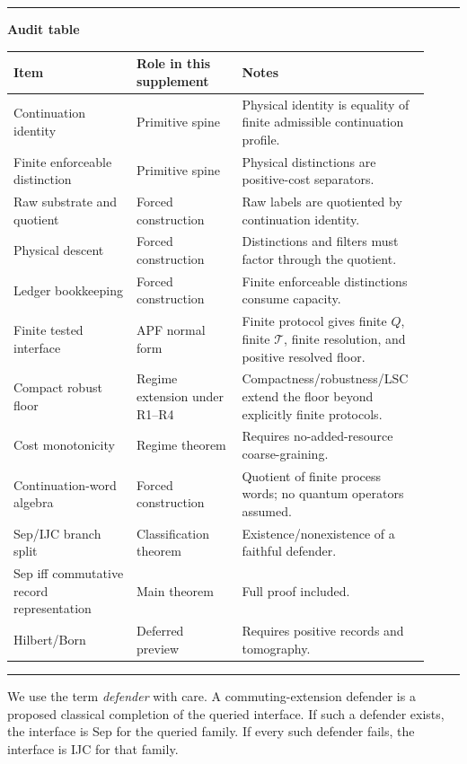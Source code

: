 \documentclass[11pt]{article}
\newenvironment{auditbox}{\par\medskip\hrule\vspace{0.4em}\textbf{Audit table}\par\vspace{0.3em}}{\vspace{0.5em}\hrule\par\medskip}
\begin{document}
\begin{auditbox}
\begin{center}
\scriptsize
\begin{tabular}{@{}p{0.28\linewidth}p{0.24\linewidth}p{0.40\linewidth}@{}}
\toprule
Item & Role in this supplement & Notes \\
\midrule
Continuation identity & Primitive spine & Physical identity is equality of finite admissible continuation profile. \\
Finite enforceable distinction & Primitive spine & Physical distinctions are positive-cost separators. \\
Raw substrate and quotient & Forced construction & Raw labels are quotiented by continuation identity. \\
Physical descent & Forced construction & Distinctions and filters must factor through the quotient. \\
Ledger bookkeeping & Forced construction & Finite enforceable distinctions consume capacity. \\
Finite tested interface & APF normal form & Finite protocol gives finite $Q$, finite $\mathcal T$, finite resolution, and positive resolved floor. \\
Compact robust floor & Regime extension under R1--R4 & Compactness/robustness/LSC extend the floor beyond explicitly finite protocols. \\
Cost monotonicity & Regime theorem & Requires no-added-resource coarse-graining. \\
Continuation-word algebra & Forced construction & Quotient of finite process words; no quantum operators assumed. \\
Sep/IJC branch split & Classification theorem & Existence/nonexistence of a faithful defender. \\
Sep iff commutative record representation & Main theorem & Full proof included. \\
Hilbert/Born & Deferred preview & Requires positive records and tomography. \\
\bottomrule
\end{tabular}
\end{center}
\end{auditbox}

We use the term \emph{defender} with care. A commuting-extension defender is a proposed classical completion of the queried interface. If such a defender exists, the interface is Sep for the queried family. If every such defender fails, the interface is IJC for that family.
\end{document}
